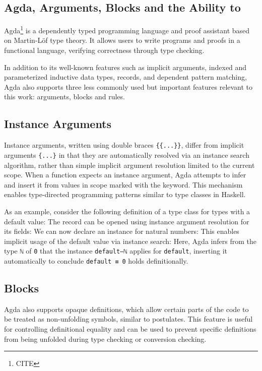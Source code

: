 \documentclass[screen,nonacm]{acmart}
\begin{document}
\subsection{Agda,  Arguments,  Blocks and the Ability to
      }\label{sec:pre-agd} Agda\footnote{CITE} is a dependently
typed programming language and proof assistant based on Martin-Löf type theory.
It allows users to write programs and proofs in a functional language,
verifying correctness through type checking.

In addition to its well-known features such as implicit arguments, indexed and
parameterized inductive data types, records, and dependent pattern matching,
Agda also supports three less commonly used but important features relevant to
this work:  arguments,  blocks and
 rules.

\subsection*{Instance Arguments}

Instance arguments, written using double braces \verb|{{...}}|, differ from
implicit arguments \verb|{...}| in that they are automatically resolved via an
instance search algorithm, rather than simple implicit argument resolution
limited to the current scope. When a function expects an instance argument,
Agda attempts to infer and insert it from values in scope marked with the
 keyword. This mechanism enables type-directed
programming patterns similar to type classes in Haskell.

As an example, consider the following definition of a type class for types with
a default value: \EDefault{} The record can be opened using instance argument
resolution for its fields: \EDefFields{} We can now declare an instance for
natural numbers: \EDefInst{} This enables implicit usage of the default value
via instance search: \EDefEx{} Here, Agda infers from the type \verb|ℕ| of
\verb|0| that the instance \verb|default–ℕ| applies for \verb|default|,
inserting it automatically to conclude \verb|default ≡ 0| holds definitionally.

\subsection*{ Blocks}

Agda also supports opaque definitions, which allow certain parts of the code to
be treated as non-unfolding symbols, similar to postulates. This feature is
useful for controlling definitional equality and can be used to prevent
specific definitions from being unfolded during type checking or conversion
checking.
\end{document}
